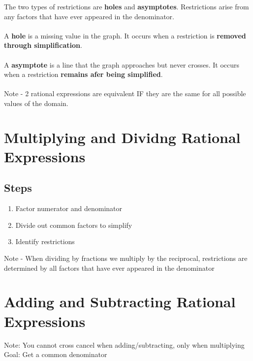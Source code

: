 \documentclass{article}
\begin{document}
\noindent
The two types of restrictions are \textbf{holes} and \textbf{asymptotes}. Restrictions arise from any factors that have ever appeared in the denominator.\\\\

\noindent
A \textbf{hole} is a missing value in the graph. It occurs when a restriction is \textbf{removed through simplification}.\\\\
A \textbf{asymptote} is a line that the graph approaches but never crosses. It occurs when a restriction \textbf{remains afer being simplified}.\\\\

\noindent
Note - 2 rational expressions are equivalent IF they are the same for all possible values of the domain.\\


\section{Multiplying and Dividng Rational Expressions}

\subsection*{Steps}
\begin{enumerate}
    \item Factor numerator and denominator
    \item Divide out common factors to simplify 
    \item Identify restrictions
\end{enumerate}

\noindent
Note - When dividing by fractions we multiply by the reciprocal, restrictions are determined by all factors that have ever appeared in the denominator\\

\section{Adding and Subtracting Rational Expressions}
Note: You cannot cross cancel when adding/subtracting, only when multiplying\\
Goal: Get a common denominator
\end{document}
